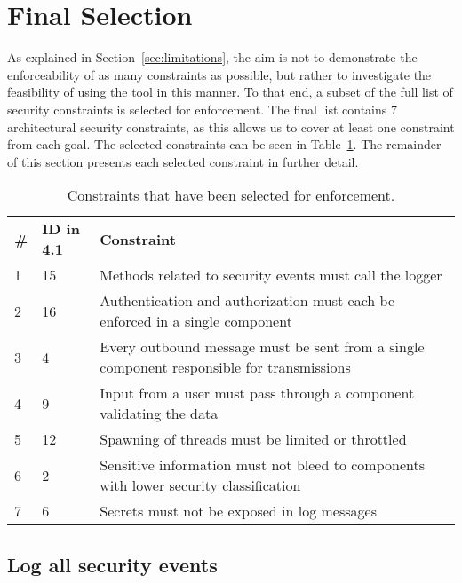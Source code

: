 \section{Final Selection}

As explained in Section~\ref{sec:limitations}, the aim is not to demonstrate the enforceability of as many constraints as possible, but rather to investigate the feasibility of using the tool in this manner. To that end, a subset of the full list of security constraints is selected for enforcement. The final list contains 7 architectural security constraints, as this allows us to cover at least one constraint from each goal. The selected constraints can be seen in Table~\ref{tab:selected_measures}. The remainder of this section presents each selected constraint in further detail.

\begin{table}
\begin{tabular}{llp{11cm}}
\hline
\textbf{\#} & \textbf{ID in 4.1} & \textbf{Constraint} \\
1 & 15 & Methods related to security events must call the logger\\
\rowcolor{RowColor}
2 & 16 & Authentication and authorization must each be enforced in a single component\\
3 & 4 & Every outbound message must be sent from a single component responsible for transmissions\\
\rowcolor{RowColor}
4 & 9 & Input from a user must pass through a component validating the data\\
5 & 12 & Spawning of threads must be limited or throttled\\
\rowcolor{RowColor}
6 & 2 & Sensitive information must not bleed to components with lower security classification\\
7 & 6 & Secrets must not be exposed in log messages\\
\hline
\end{tabular}
\caption{Constraints that have been selected for enforcement.}
\label{tab:selected_measures}
\end{table}


\subsection{Log all security events \checkmark} 

